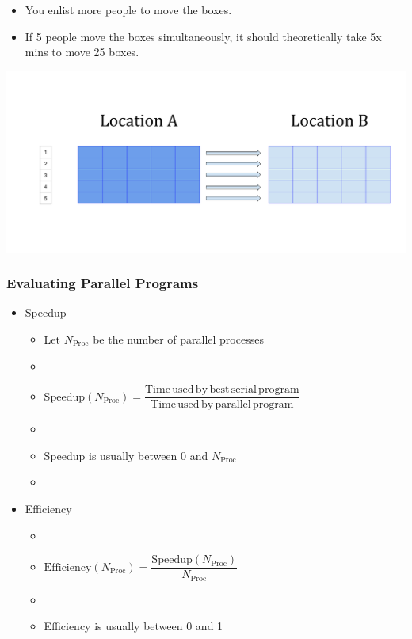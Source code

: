 \documentclass[10pt,t]{beamer}
\begin{document}
\begin{frame}
\frametitle{ }
\begin{itemize}
\item You enlist more people to move the boxes.
\item If 5 people move the boxes simultaneously, it should theoretically take 5x mins to move 25 boxes.
\end{itemize}
\includegraphics[width=\textwidth,clip=true]{./Parallel}
\end{frame}

\begin{frame}
\frametitle{Evaluating Parallel Programs}
\begin{itemize}
\item Speedup
\begin{itemize}
\item Let $N_{\mathrm{Proc}}$ be the number of parallel processes
\item[] 
\item $\mathrm{Speedup}(N_{\mathrm{Proc}}) = \dfrac{\mathrm{Time\,used\,by\,best\,serial\,program}}{\mathrm{Time\,used\,by\,parallel\,program}}$ 
\item[]
\item Speedup is usually between 0 and $N_{\mathrm{Proc}}$
\item[] 
\end{itemize}
\item Efficiency
\begin{itemize}
\item[]
\item $\mathrm{Efficiency}(N_{\mathrm{Proc}}) = \dfrac{\mathrm{Speedup}(N_{\mathrm{Proc}})}{N_{\mathrm{Proc}}}$
\item[]
\item Efficiency is usually between 0 and 1
\end{itemize}
\end{itemize}
\end{frame}
\end{document}

